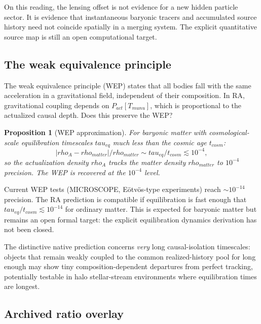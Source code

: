 \documentclass[11pt]{article}
\def\rho{rho}%
\def\mu{mu}%
\def\tau{tau}%
\def\nu{nu}%
\def\mathrm#1{#1}%
\def\frac#1#2{#1/#2}%
\newtheorem{proposition}{Proposition}
\begin{document}
On this reading, the lensing offset is not evidence for a new hidden particle sector. It is evidence that instantaneous baryonic tracers and accumulated source history need not coincide spatially in a merging system. The explicit quantitative source map is still an open computational target.

\subsection{The weak equivalence principle}
\label{sec:wep}

The weak equivalence principle (WEP) states that all bodies fall with the same acceleration in a gravitational field, independent of their composition. In RA, gravitational coupling depends on $P_{\mathrm{act}}[T_{\mu\nu}]$, which is proportional to the actualized causal depth. Does this preserve the WEP?

\begin{proposition}[WEP approximation]
\label{prop:wep}
For baryonic matter with cosmological-scale equilibration timescales $\tau_{\mathrm{eq}}$ much less than the cosmic age $t_{\mathrm{cosm}}$:
\begin{equation}
\frac{|\rho_{\mathrm{A}} - \rho_{\mathrm{matter}}|}{\rho_{\mathrm{matter}}} \sim \frac{\tau_{\mathrm{eq}}}{t_{\mathrm{cosm}}} \lesssim 10^{-4},
\end{equation}
so the actualization density $\rho_{\mathrm{A}}$ tracks the matter density $\rho_{\mathrm{matter}}$ to $10^{-4}$ precision. The WEP is recovered at the $10^{-4}$ level.
\end{proposition}

Current WEP tests (MICROSCOPE, E\"otv\"os-type experiments) reach $\sim 10^{-14}$ precision. The RA prediction is compatible if equilibration is fast enough that $\tau_{\mathrm{eq}}/t_{\mathrm{cosm}} \lesssim 10^{-14}$ for ordinary matter. This is expected for baryonic matter but remains an open formal target: the explicit equilibration dynamics derivation has not been closed.

The distinctive native prediction concerns \emph{very} long causal-isolation timescales: objects that remain weakly coupled to the common realized-history pool for long enough may show tiny composition-dependent departures from perfect tracking, potentially testable in halo stellar-stream environments where equilibration times are longest.

\subsection{Archived ratio overlay}
\end{document}
